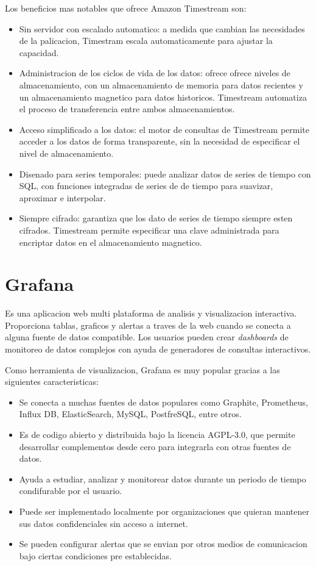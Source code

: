 Los beneficios mas notables que ofrece Amazon Timestream son:
\begin{itemize}
	\item Sin servidor con escalado automatico: a medida que cambian las necesidades de la palicacion, Timestram escala automaticamente para ajustar la capacidad.
	\item Administracion de los ciclos de vida de los datos: ofrece ofrece niveles de almacenamiento, con un almacenamiento de memoria para datos recientes y un almacenamiento magnetico para datos historicos. Timestream automatiza el proceso de transferencia entre ambos almacenamientos.
	\item Acceso simplificado a los datos: el motor de consultas de Timestream permite acceder a los datos de forma transparente, sin la necesidad de especificar el nivel de almacenamiento.
	\item Disenado para series temporales: puede analizar datos de series de tiempo con SQL, con funciones integradas de series de de tiempo para suavizar, aproximar e interpolar.
	\item Siempre cifrado: garantiza que los dato de series de tiempo siempre esten cifrados. Timestream permite especificar una clave administrada para encriptar datos en el almacenamiento magnetico.
	
\end{itemize}

\section{Grafana}
Es una aplicacion web multi plataforma de analisis y visualizacion interactiva. Proporciona tablas, graficos y alertas a traves de la web cuando se conecta a alguna fuente de datos compatible. Los usuarios pueden crear \textit{dashboards} de monitoreo de datos complejos con ayuda de generadores de consultas interactivos.

Como herramienta de visualizacion, Grafana es muy popular gracias a las siguientes caracteristicas:
\begin{itemize}
	\item Se conecta a muchas fuentes de datos populares como Graphite, Prometheus, Influx DB, ElasticSearch, MySQL, PostfreSQL, entre otros.
	\item Es de codigo abierto y distribuida bajo la licencia  AGPL-3.0, que permite desarrollar complementos desde cero para integrarla con otras fuentes de datos.
	\item Ayuda a estudiar, analizar y monitorear datos durante un periodo de tiempo condifurable por el usuario.
	\item Puede ser implementado localmente por organizaciones que quieran mantener sus datos confidenciales sin acceso a internet.
	\item Se pueden configurar alertas que se envian por otros medios de comunicacion bajo ciertas condiciones pre establecidas.
\end{itemize}

